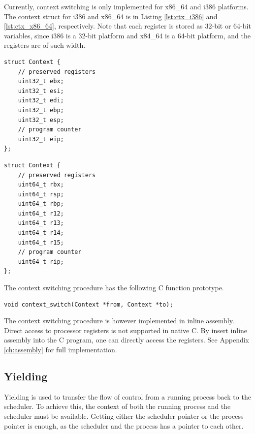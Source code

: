Currently, context switching is only implemented for x86\_64 and i386 platforms. The context struct for i386 and x86\_64 is in Listing \ref{lst:ctx_i386} and \ref{lst:ctx_x86_64}, respectively. Note that each register is stored as 32\hyp{}bit or 64\hyp{}bit variables, since i386 is a 32\hyp{}bit platform and x84\_64 is a 64\hyp{}bit platform, and the registers are of such width.

\noindent\begin{minipage}{.45\textwidth}
\begin{lstlisting}[caption={Context struct for i386},style={CustomC},label={lst:ctx_i386}]
struct Context {
    // preserved registers
    uint32_t ebx;  
    uint32_t esi;
    uint32_t edi;
    uint32_t ebp;
    uint32_t esp;
    // program counter
    uint32_t eip;
};
\end{lstlisting}
\end{minipage}\hfill
\begin{minipage}{.45\textwidth}
\begin{lstlisting}[caption={Context struct for x86\_64},style={CustomC},label={lst:ctx_x86_64}]
struct Context {
    // preserved registers
    uint64_t rbx;  
    uint64_t rsp;
    uint64_t rbp;
    uint64_t r12;
    uint64_t r13;
    uint64_t r14;
    uint64_t r15;
    // program counter
    uint64_t rip;
};
\end{lstlisting}
\end{minipage}

The context switching procedure has the following C function prototype.

\begin{lstlisting}[style={CustomC},frame={},numbers=none]
void context_switch(Context *from, Context *to);
\end{lstlisting}

The context switching procedure is however implemented in inline assembly. Direct access to processor registers is not supported in native C. By insert inline assembly into the C program, one can directly access the registers. See Appendix \ref{ch:assembly} for full implementation.


\subsection{Yielding}
\label{subsec:yielding_impl}

Yielding is used to transfer the flow of control from a running process back to the scheduler. To achieve this, the context of both the running process and the scheduler must be available. Getting either the scheduler pointer or the process pointer is enough, as the scheduler and the process has a pointer to each other. 

